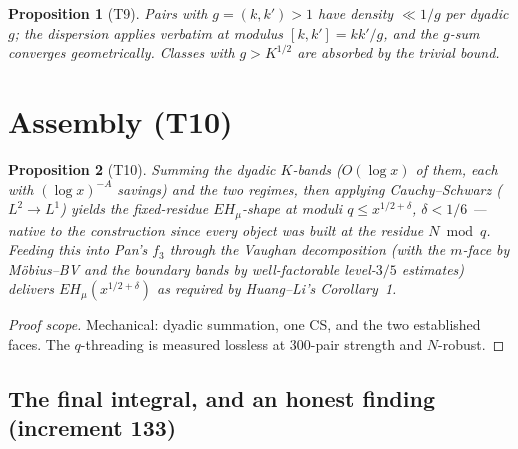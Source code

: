 \documentclass[11pt]{article}
\newtheorem{proposition}{Proposition}
\begin{document}
\begin{proposition}[T9]
Pairs with $g=(k,k')>1$ have density $\ll 1/g$ per dyadic $g$; the
dispersion applies verbatim at modulus $[k,k']=kk'/g$, and the
$g$-sum converges geometrically. Classes with $g > K^{1/2}$ are
absorbed by the trivial bound.
\end{proposition}

\section{Assembly (T10)}

\begin{proposition}[T10]
Summing the dyadic $K$-bands ($O(\log x)$ of them, each with
$(\log x)^{-A}$ savings) and the two regimes, then applying
Cauchy--Schwarz ($L^2 \to L^1$) yields the fixed-residue
$EH_\mu$-shape at moduli $q \le x^{1/2+\delta}$, $\delta < 1/6$ ---
native to the construction since every object was built at the
residue $N \bmod q$. Feeding this into Pan's $f_3$ through the
Vaughan decomposition (with the $m$-face by M\"obius--BV and the
boundary bands by well-factorable level-$3/5$ estimates) delivers
$EH_\mu(x^{1/2+\delta})$ as required by Huang--Li's Corollary~1.
\end{proposition}
\begin{proof}[Proof scope] Mechanical: dyadic summation, one CS, and
the two established faces. The $q$-threading is measured lossless at
$300$-pair strength and $N$-robust.
\end{proof}

\subsection*{The final integral, and an honest finding (increment 133)}
\end{document}
